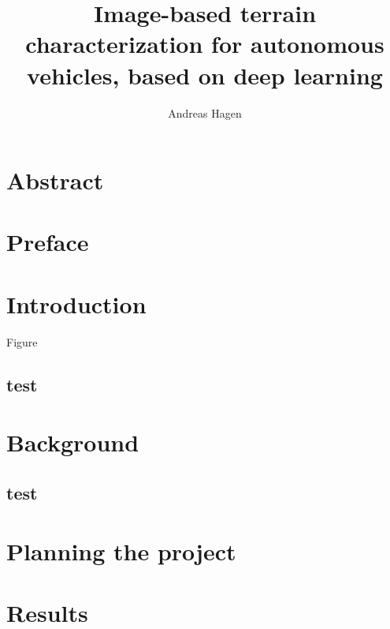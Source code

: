 \documentclass[UKenglish]{ifimaster}  %
\title{Image-based terrain characterization for autonomous vehicles, based on deep learning}        %
\author{Andreas Hagen}                      %
\begin{document}
\duoforside[dept={Department of Technology Systems},   %
  program={Cybernetics},  %
  short]                                        %

\frontmatter{}
\chapter*{Abstract}                   %

\tableofcontents{}
\listoffigures{}
\listoftables{}

\chapter*{Preface}                    %

\mainmatter{}
\chapter{Introduction}                   %
Figure\cite{HanDerreToby} 
\section{test}

\chapter{Background}                  %
\section{test}


\chapter{Planning the project}        %

\chapter{Results}                     %



\backmatter{}
\printbibliography
\end{document}
